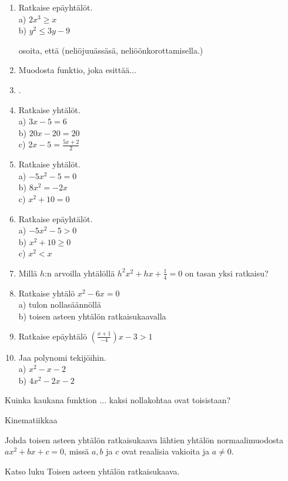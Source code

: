 \begin{enumerate}
\item Ratkaise epäyhtälöt. \\
a) $2x^3 \geq x$ \\
b) $y^2 \leq 3y -9 $

osoita, että (neliöjuuässäsä, neliöönkorottamisella.)
\item Muodosta funktio, joka esittää...

\item .
\item Ratkaise yhtälöt.\\ a) $3x-5=6$\\ b) $20x-20=20$\\ c) $2x-5=\frac{5x+2}{2}$
\item Ratkaise yhtälöt.\\ a) $-5x^2-5=0$\\ b) $8x^2=-2x$\\ c) $x^2+10=0$
\item Ratkaise epäyhtälöt.\\ a) $-5x^2-5>0$\\ b) $x^2+10\geq0$\\ c) $x^2<x$
\item Millä $h$:n arvoilla yhtälöllä $h^2x^2+hx+\frac{1}{4}=0$ on tasan yksi ratkaisu?
\item Ratkaise yhtälö $x^2-6x=0$\\ a) tulon nollasäännöllä\\ b) toisen asteen yhtälön ratkaisukaavalla
\item Ratkaise epäyhtälö $(\frac{x+1}{-4})x-3>1$
\item Jaa polynomi tekijöihin.\\ a) $x^2-x-2$\\ b) $4x^2-2x-2$
\end{enumerate}

Kuinka kaukana funktion ... kaksi nollakohtaa ovat toisistaan?

Kinematiikkaa

\begin{tehtava}
Johda toisen asteen yhtälön ratkaisukaava lähtien yhtälön normaalimuodosta $ax^2+bx+c=0$, missä $a, b$ ja $c$ ovat reaalisia vakioita ja $a \neq 0$.
	\begin{vastaus}
	Katso luku Toisen asteen yhtälön ratkaisukaava.
	\end{vastaus}
\end{tehtava}

